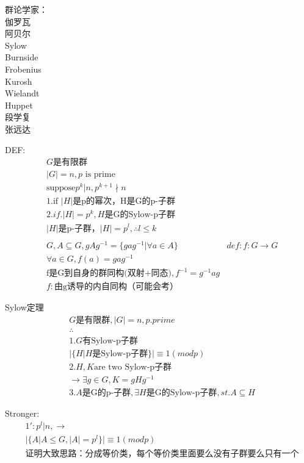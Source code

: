 \documentclass[12pt, a4paper]{article}  %
\begin{document}
群论学家：\\
伽罗瓦\\
阿贝尔\\
Sylow\\
Burnside\\
Frobenius\\
Kurosh\\
Wielandt\\
Huppet\\
段学复\\
张远达


DEF:
\begin{align}
    &G\text{是有限群}\\
    &|G|=n,p\text{ is prime}\\
    &\text{suppose} p^k|n,p^{k+1}\nmid n\\
    &1.\text{if } |H|\text{是p的幂次，H是G的p-子群}\\
    &2.if.|H|=p^k,H\text{是G的Sylow-p子群}\\
    &|H|\text{是p-子群，}|H|=p^l,\therefore l\leqslant k\\
    &\\
    &G,A\subseteq G,gAg^{-1}=\{gag^{-1}|\forall a\in A\}
    & def:f:G\rightarrow G\\
    &\forall a\in G,f(a)=gag^{-1}\\
    &\text{f是G到自身的群同构(双射+同态)},f^{-1}=g^{-1}ag\\
    &f:\text{由g诱导的内自同构（可能会考）}
\end{align}

Sylow定理
\begin{align}
    &G\text{是有限群},|G|=n,p.prime\\
    &\therefore\\
    &1.G\text{有Sylow-p子群}\\
    &|\{H|H\text{是Sylow-p子群}\}|\equiv 1(mod p)\\
    &2.H,K\text{are two Sylow-p子群}\\
    &\rightarrow \exists g\in G,K=gHg^{-1}\\
    &3.A \text{是G的p-子群},\exists H \text{是G的Sylow-p子群},st. A\subseteq H
\end{align}

Stronger:
\begin{align}
    &1':p^l|n,\rightarrow\\
    &|\{A|A\leqslant G,|A|=p^l\}|\equiv 1(mod p)\\
    &\text{证明大致思路：分成等价类，每个等价类里面要么没有子群要么只有一个}
\end{align}
\end{document}
